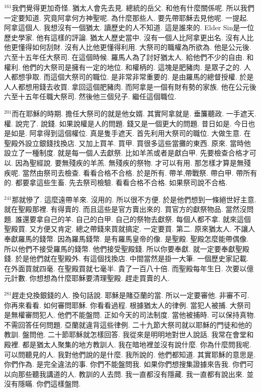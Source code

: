 \documentclass{book}
\begin{document}
$^{161}$我們覺得更加奇怪.
猶太人會先去見.
總統的岳父.
和他有什麼關係呢.
所以我們一定要知道.
究竟阿拿何方神聖呢.
為什麼那些人.
要先帶耶穌去見他呢.
一提起.
阿拿這個人.
我想沒有一個猶太.
讀歷史的人不知道.
這是誰來的.
Elder Sin是一位歷史學家.
他有這樣的評論.
猶太人歷史當中.
沒有一個人比阿拿更出名.
沒有人比他更懂得如何刮財.
沒有人比他更懂得利用.
大祭司的職權為所欲為.
他是公元後.
六至十五年任大祭司.
在這個時候.
羅馬人為了討好猶太人.
給他們不少的自由.
和權利.
他們的大祭司是擁有一定的地位.
和權柄的.
這塊是肥豬肉.
是眾子之的.
人人都想爭取.
而這個大祭司的職位.
是非常非常重要的.
是由羅馬的總督授權.
於是人人都想用錢去收買.
拿回這個肥豬肉.
而阿拿是一個有財有勢的家族.
他在公元後六至十五年任職大祭司.
然後他三個兒子.
繼任這個職位.

$^{201}$而在耶穌的時期.
擔任大祭司的就是他女婿.
其實阿拿就是.
垂簾聽政.
一手遮天.
權.
說完了.
說錢.
如果說權是人的問題.
錢又是一個更大的問題.
昔日如是.
今日也是如是.
阿拿得到這個權位.
真是隻手遮天.
首先利用大祭司的職位.
大做生意.
在聖殿外設立銀錢找換店.
又加上買羊.
買甲.
買很多這些當攤的東西.
原來.
當時他設立了一種制度.
就是每一個人去獻祭.
比如羊羔或者是獻白甲.
先要檢查合格才可以.
因為聖經說.
要無殘疾的羊羔.
無殘疾的祭物.
才可以有用.
那怎樣才算是無殘疾呢.
當然由祭司去檢查.
看看合格不合格.
於是所有.
帶羊,帶戰祭.
帶白甲.
帶所有的.
都要拿這些生畜.
先去祭司檢驗.
看看合格不合格.
如果祭司說不合格.

$^{241}$那就慘了.
這麼遠帶羊來.
沒用的.
所以很不方便.
於是他們想到一條絕世好主意.
就在聖殿那裡.
有得賣的.
而且這些是官方賣出來的.
買官方的獻祭物品.
當然沒問題.
誰還要拿自己的羊.
自己的白甲.
自己的祭物去獻祭.
每個人都不拿.
就來這個聖殿買.
又方便又肯定.
總之帶錢來買就搞定.
一定要買.
第二.
原來猶太人.
不讓人奉獻羅馬的錢幣.
因為羅馬錢幣.
是有羅馬皇帝的像.
是聖殿.
聖殿怎麼能帶偶像.
所以他們不接受羅馬的錢幣.
他們接受聖殿錢.
所以你要奉獻.
就一定要奉獻聖殿錢.
於是他們就在聖殿外.
有這個找換店.
中間當然是掛一大筆.
一個歷史家記載.
在外面買就四毫.
在聖殿買就七毫半.
貴了一百八十倍.
而聖殿每年生日.
次要以億元計數.
你想想為什麼耶穌要清理聖殿.
趕走買賣的人.

$^{281}$趕走兌換銀錢的人.
換句話說.
耶穌是賭亞蘭的當.
所以一定要審他.
非審不可.
你再來看看.
如何審問耶穌.
你看看過程.
根據猶太人的律例.
當犯人被捕.
大祭司是無權審問犯人.
他們不能盤問.
正如今天的司法制度.
當他被捕時.
可以保持真物.
不需回答任何問題.
亞蘭就違背這些律例.
二十九節大祭司就以耶穌的門徒和他的教訓.
盤問他.
二十節耶穌就怎樣回答.
我從來是明明地對世人說話.
我常在會堂和殿裡.
都是猶太人聚集的地方教訓人.
我在暗地裡並沒有說什麼.
你為什麼問我呢.
可以問聽見的人.
我對他們說的是什麼.
我所說的.
他們都知道.
其實耶穌的意思是.
你們作為.
是完全違法的事.
你們不能盤問我.
如果你們想搜集證據來告我.
你們可以向那些聽我講道的人.
教訓的人去問.
我一直都沒有隱藏.
我一直都有說出來.
並沒有隱瞞.
你們這樣盤問.
\end{document}

